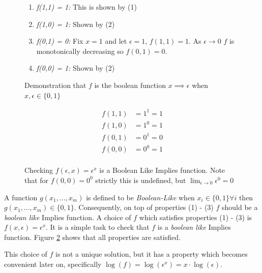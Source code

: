\noindent
\begin{minipage}[t]{0.5\textwidth}
\begin{figure}[H]
\begin{enumerate}
\item \textit{f(1,1) = 1:} This is shown by (1)
\item \textit{f(1,0) = 1:} Shown by (2)
\item \textit{f(0,1) = 0:} Fix $x = 1$ and let $\epsilon = 1$, $f(1,1) = 1$. As $\epsilon \rightarrow 0 $ $f$ is monotonically decreasing so $f(0,1) = 0$.
\item \textit{f(0,0) = 1:} Shown by (2)
\end{enumerate}
\caption{Demonstration that $f$ is the boolean function $x \implies \epsilon$ when $x,\epsilon \in \{0, 1\}$}
\label{fig:f-actually-implies}
\end{figure}
\end{minipage}
\hspace{0.05\textwidth}
\begin{minipage}[t]{0.45\textwidth}
\begin{figure}[H]
\begin{align*}
f(1,1) &= 1^1 = 1\\
f(1,0) &= 1^0 = 1\\
f(0,1) &= 0^1 = 0\\
f(0,0) &= 0^0 = 1\\
\end{align*}
\caption{Checking $f(\epsilon, x) = \epsilon^x$ is a Boolean Like Implies function. Note that for $f(0,0) = 0^0$ strictly this is undefined, but $\lim_{\epsilon \rightarrow 0} \epsilon^0 = 0$\\}
\label{fig:f-check-implies}
\end{figure}
\end{minipage}

A function $g(x_1, ..., x_m)$ is defined to be \textit{Boolean-Like} \cite{williams1986logic} when $x_i \in \{0, 1\} \forall i$ then $g(x_1, ..., x_m) \in \{0, 1\}$. Consequently, on top of properties (1) - (3) $f$ should be a \textit{boolean like} Implies function. A choice of $f$ which satisfies properties (1) - (3) is $f(x, \epsilon) = \epsilon^x$. It is a simple task to check that $f$ is a \textit{boolean like} Implies function. Figure \ref{fig:f-check-implies} shows that all properties are satisfied.


This choice of $f$ is not a unique solution, but it has a property which becomes convenient later on, specifically $\log(f) = \log(\epsilon^x) = x \cdot \log(\epsilon)$.

